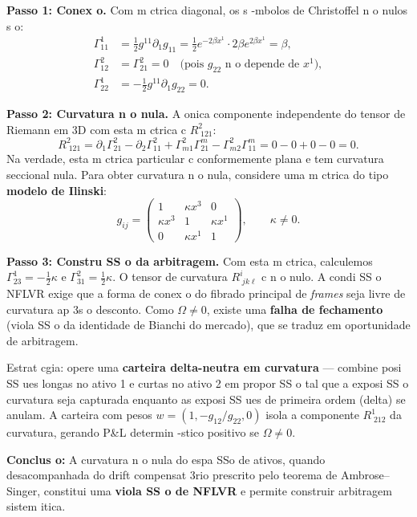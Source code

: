 \begin{sol}
\textbf{Passo 1: Conex o.} Com m ctrica diagonal, os s -mbolos de Christoffel n o nulos s o:
\begin{align*}
 \Gamma^1_{11} &= \tfrac{1}{2}g^{11}\partial_1 g_{11} = \tfrac{1}{2}e^{-2\beta x^1}\cdot 2\beta e^{2\beta x^1} = \beta,\\
 \Gamma^2_{12} &= \Gamma^2_{21} = 0\quad\text{(pois $g_{22}$ n o depende de $x^1$)},\\
 \Gamma^1_{22} &= -\tfrac{1}{2}g^{11}\partial_1 g_{22} = 0.
\end{align*}

\textbf{Passo 2: Curvatura n o nula.} A onica componente independente do tensor de Riemann em 3D com esta m ctrica c $R^2_{\;121}$:
\begin{equation}
 R^2_{\;121} = \partial_1\Gamma^2_{21} - \partial_2\Gamma^2_{11} + \Gamma^2_{m1}\Gamma^m_{21} - \Gamma^2_{m2}\Gamma^m_{11} = 0 - 0 + 0 - 0 = 0.
\end{equation}
Na verdade, esta m ctrica particular c conformemente plana e tem curvatura seccional nula. Para obter curvatura n o nula, considere uma m ctrica do tipo \textbf{modelo de Ilinski}:
\begin{equation}
 g_{ij} = \begin{pmatrix}
 1 & \kappa x^3 & 0 \\
 \kappa x^3 & 1 & \kappa x^1 \\
 0 & \kappa x^1 & 1
 \end{pmatrix},\qquad \kappa\neq 0.
\end{equation}

\textbf{Passo 3: Constru SS o da arbitragem.} Com esta m ctrica, calculemos $\Gamma^1_{23} = -\frac{1}{2}\kappa$ e $\Gamma^2_{31} = \frac{1}{2}\kappa$. O tensor de curvatura $R^i_{\;jk\ell}$ c n o nulo. A condi SS o NFLVR exige que a forma de conex o do fibrado principal de \textit{frames} seja livre de curvatura ap 3s o desconto. Como $\Omega\neq 0$, existe uma \textbf{falha de fechamento} (viola SS o da identidade de Bianchi do mercado), que se traduz em oportunidade de arbitragem.

Estrat cgia: opere uma \textbf{carteira delta-neutra em curvatura} --- combine posi SS ues longas no ativo 1 e curtas no ativo 2 em propor SS o tal que a exposi SS o curvatura seja capturada enquanto as exposi SS ues de primeira ordem (delta) se anulam. A carteira com pesos $w = (1, -g_{12}/g_{22}, 0)$ isola a componente $R^1_{\;212}$ da curvatura, gerando P\&L determin -stico positivo se $\Omega\neq 0$.

\textbf{Conclus o:} A curvatura n o nula do espa SSo de ativos, quando desacompanhada do drift compensat 3rio prescrito pelo teorema de Ambrose--Singer, constitui uma \textbf{viola SS o de NFLVR} e permite construir arbitragem sistem itica.
\end{sol}

